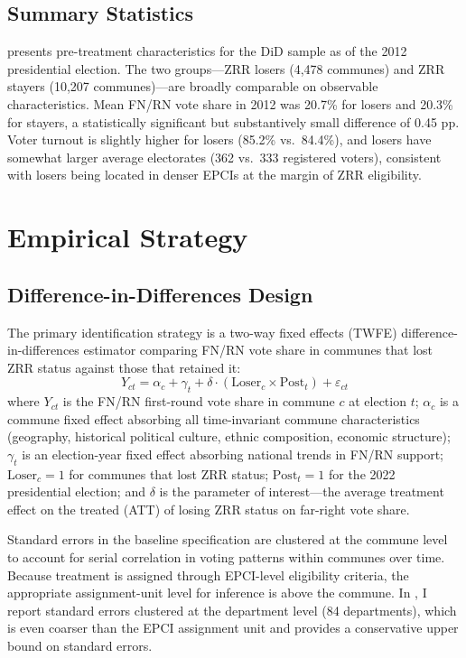 \documentclass[12pt]{article}
\begin{document}
\subsection{Summary Statistics}

 presents pre-treatment characteristics for the DiD sample as of the 2012 presidential election. The two groups---ZRR losers (4,478 communes) and ZRR stayers (10,207 communes)---are broadly comparable on observable characteristics. Mean FN/RN vote share in 2012 was 20.7\% for losers and 20.3\% for stayers, a statistically significant but substantively small difference of 0.45 pp. Voter turnout is slightly higher for losers (85.2\% vs.\ 84.4\%), and losers have somewhat larger average electorates (362 vs.\ 333 registered voters), consistent with losers being located in denser EPCIs at the margin of ZRR eligibility.



\section{Empirical Strategy} \label{sec:strategy}

\subsection{Difference-in-Differences Design}

The primary identification strategy is a two-way fixed effects (TWFE) difference-in-differences estimator comparing FN/RN vote share in communes that lost ZRR status against those that retained it:
\begin{equation} \label{eq:did}
Y_{ct} = \alpha_c + \gamma_t + \delta \cdot (\text{Loser}_c \times \text{Post}_t) + \varepsilon_{ct}
\end{equation}
where $Y_{ct}$ is the FN/RN first-round vote share in commune $c$ at election $t$; $\alpha_c$ is a commune fixed effect absorbing all time-invariant commune characteristics (geography, historical political culture, ethnic composition, economic structure); $\gamma_t$ is an election-year fixed effect absorbing national trends in FN/RN support; $\text{Loser}_c = 1$ for communes that lost ZRR status; $\text{Post}_t = 1$ for the 2022 presidential election; and $\delta$ is the parameter of interest---the average treatment effect on the treated (ATT) of losing ZRR status on far-right vote share.

Standard errors in the baseline specification are clustered at the commune level to account for serial correlation in voting patterns within communes over time. Because treatment is assigned through EPCI-level eligibility criteria, the appropriate assignment-unit level for inference is above the commune. In , I report standard errors clustered at the department level (84 departments), which is even coarser than the EPCI assignment unit and provides a conservative upper bound on standard errors.
\end{document}
